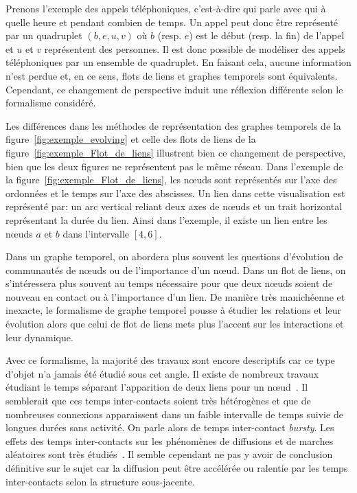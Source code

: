Prenons l'exemple des appels téléphoniques, c'est-à-dire qui parle avec qui à quelle heure et pendant combien de temps.
Un appel peut donc être représenté par un quadruplet $(b,e,u,v)$ où $b$ (resp. $e$) est le début (resp. la fin) de l'appel et $u$ et $v$ représentent des personnes.
Il est donc possible de modéliser des appels téléphoniques par un ensemble de quadruplet.
En faisant cela, aucune information n'est perdue et, en ce sens, flots de liens et graphes temporels sont équivalents. 
Cependant, ce changement de perspective induit une réflexion différente selon le formalisme considéré.

Les différences dans les méthodes de représentation des graphes temporels de la figure~\ref{fig:exemple_evolving} et celle des flots de liens de la figure~\ref{fig:exemple_Flot_de_liens} illustrent bien ce changement de perspective, bien que les deux figures ne représentent pas le même réseau.
Dans l'exemple de la figure~\ref{fig:exemple_Flot_de_liens}, les n\oe{}uds sont représentés sur l'axe des ordonnées et le temps sur l'axe des abscisses.
Un lien dans cette visualisation est représenté par: un arc vertical reliant deux axes de n\oe{}uds et un trait horizontal représentant la durée du lien.
Ainsi dans l'exemple, il existe un lien entre les n\oe{}uds $a$ et $b$ dans l'intervalle $[4,6]$.

Dans un graphe temporel, on abordera plus souvent les questions d'évolution de communautés de n\oe{}uds ou de l'importance d'un n\oe{}ud.
Dans un flot de liens, on s'intéressera plus souvent au temps nécessaire pour que deux n\oe{}uds soient de nouveau en contact ou à l'importance d'un lien.
De manière très manichéenne et inexacte, le formalisme de graphe temporel pousse à étudier les relations et leur évolution alors que celui de flot de liens mets plus l'accent sur les interactions et leur dynamique.

\bigskip



Avec ce formalisme, la majorité des travaux sont encore descriptifs car ce type d'objet n'a jamais été étudié sous cet angle.
Il existe de nombreux travaux étudiant le temps séparant l'apparition de deux liens pour un n\oe{}ud~\cite{Malmgren2008,Malmgren2009}.
Il semblerait que ces temps inter-contacts soient très hétérogènes et que de nombreuses connexions apparaissent dans un faible intervalle de temps suivie de longues durées sans activité.
On parle alors de temps inter-contact \emph{bursty}.
Les effets des temps inter-contacts sur les phénomènes de diffusions et de marches aléatoires sont très étudiés~\cite{Karsai2011,Karsai2012a,Starnini2012b,Rocha2013}.
Il semble cependant ne pas y avoir de conclusion définitive sur le sujet car la diffusion peut être accélérée ou ralentie par les temps inter-contacts selon la structure sous-jacente.

